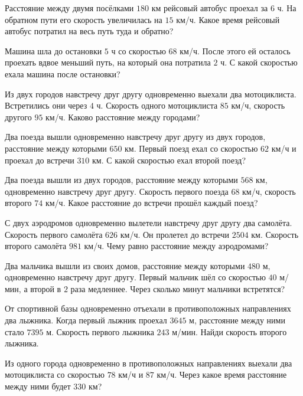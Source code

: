 \begin{class}[number=7]
	\begin{listofex}
		\item Расстояние между двумя посёлками \( 180 \) км рейсовый автобус проехал за \( 6 \) ч. На обратном пути его скорость увеличилась на \( 15 \) км/ч. Какое время рейсовый автобус потратил на весь путь туда и обратно?
		\item Машина шла до остановки \( 5 \) ч со скоростью \( 68 \) км/ч. После этого ей осталось проехать вдвое меньший путь, на который она потратила \( 2 \) ч. С какой скоростью ехала машина после остановки?
		\item Из двух городов навстречу друг другу одновременно выехали два мотоциклиста. Встретились они через \( 4 \) ч. Скорость одного мотоциклиста \( 85 \) км/ч, скорость другого \( 95 \) км/ч. Каково расстояние между городами?
		\item Два поезда вышли одновременно навстречу друг другу из двух городов, расстояние между которыми \( 650 \) км. Первый поезд ехал со скоростью \( 62 \) км/ч и проехал до встречи \( 310 \) км. С какой скоростью ехал второй поезд?
		\item Два поезда вышли из двух городов, расстояние между которыми \( 568 \) км, одновременно навстречу друг другу. Скорость первого поезда \( 68 \) км/ч, скорость второго \( 74 \) км/ч. Какое расстояние до встречи прошёл каждый поезд?
		\item С двух аэродромов одновременно вылетели навстречу друг другу два самолёта. Скорость первого самолёта \( 626 \) км/ч. Он пролетел до встречи \( 2504 \) км. Скорость второго самолёта \( 981 \) км/ч. Чему равно расстояние между аэродромами?
		\item Два мальчика вышли из своих домов, расстояние между которыми \( 480 \) м, одновременно навстречу друг другу. Первый мальчик шёл со скоростью \( 40 \) м/мин, а второй в \( 2 \) раза медленнее. Через сколько минут мальчики встретятся?
		\item От спортивной базы одновременно отъехали в противоположных направлениях два лыжника. Когда первый лыжник проехал \( 3645 \) м, расстояние между ними стало \( 7395 \) м. Скорость первого лыжника \( 243 \) м/мин. Найди скорость второго лыжника.
		\item Из одного города одновременно в противоположных направлениях выехали два мотоциклиста со скоростью \( 78 \) км/ч и \( 87 \) км/ч. Через какое время расстояние между ними будет \( 330 \) км?
	\end{listofex}
\end{class}

